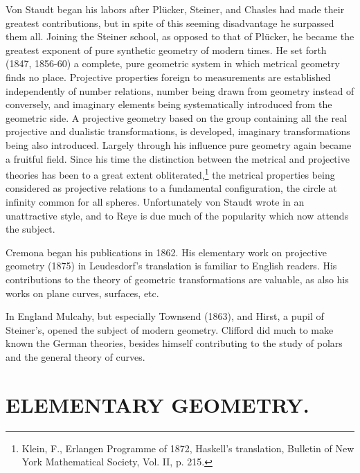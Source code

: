 \documentclass[oneside]{book}
\begin{document}
Von Staudt began his labors after Pl\"ucker, Steiner, and Chasles had
made their greatest contributions, but in spite of this seeming
disadvantage he surpassed them all. Joining the Steiner school, as
opposed to that of Pl\"ucker, he became the greatest exponent of pure
synthetic geometry of modern times. He set forth (1847, 1856-60) a
complete, pure geometric system in which metrical geometry finds no
place. Projective properties foreign to measurements are
established independently of number relations, number being drawn
from geometry instead of conversely, and imaginary elements being
systematically introduced from the geometric side. A projective
geometry based on the group containing all the real projective and
dualistic transformations, is developed, imaginary transformations
being also introduced. Largely through his influence pure geometry
again became a fruitful field. Since his time the distinction
between the metrical and projective theories has been to a great
extent obliterated,\footnote{Klein, F., Erlangen Programme of
1872, Haskell's translation, Bulletin of New York Mathematical
Society, Vol. II, p. 215.} the metrical properties being considered
as projective relations to a fundamental configuration, the circle
at infinity common for all spheres. Unfortunately von Staudt wrote
in an unattractive style, and to Reye is due much of the popularity
which now attends the subject.

Cremona began his publications in 1862. His elementary work on
projective geometry (1875) in Leudesdorf's translation is familiar
to English readers. His contributions to the theory of geometric
transformations are valuable, as also his works on plane curves,
surfaces, etc.

In England Mulcahy, but especially Townsend (1863), and Hirst, a
pupil of Steiner's, opened the subject of modern geometry. Clifford
did much to make known the German theories, besides himself
contributing to the study of polars and the general theory of curves.

\chapter{ELEMENTARY GEOMETRY.}
\end{document}
